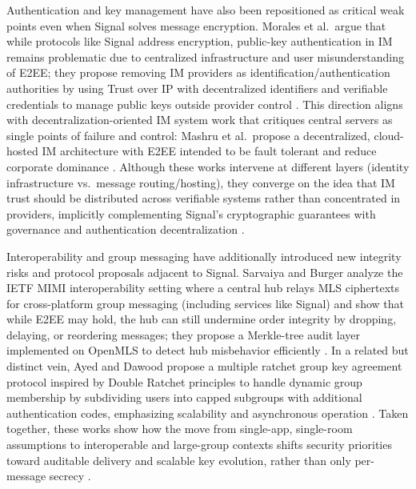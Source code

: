 Authentication and key management have also been repositioned as critical weak points even when Signal solves message encryption. Morales et al.\ argue that while protocols like Signal address encryption, public-key authentication in IM remains problematic due to centralized infrastructure and user misunderstanding of E2EE; they propose removing IM providers as identification/authentication authorities by using Trust over IP with decentralized identifiers and verifiable credentials to manage public keys outside provider control \cite{morales2024}. This direction aligns with decentralization-oriented IM system work that critiques central servers as single points of failure and control: Mashru et al.\ propose a decentralized, cloud-hosted IM architecture with E2EE intended to be fault tolerant and reduce corporate dominance \cite{mashru2023}. Although these works intervene at different layers (identity infrastructure vs.\ message routing/hosting), they converge on the idea that IM trust should be distributed across verifiable systems rather than concentrated in providers, implicitly complementing Signal’s cryptographic guarantees with governance and authentication decentralization \cite{morales2024,mashru2023}.

Interoperability and group messaging have additionally introduced new integrity risks and protocol proposals adjacent to Signal. Sarvaiya and Burger analyze the IETF MIMI interoperability setting where a central hub relays MLS ciphertexts for cross-platform group messaging (including services like Signal) and show that while E2EE may hold, the hub can still undermine order integrity by dropping, delaying, or reordering messages; they propose a Merkle-tree audit layer implemented on OpenMLS to detect hub misbehavior efficiently \cite{sarvaiya2025}. In a related but distinct vein, Ayed and Dawood propose a multiple ratchet group key agreement protocol inspired by Double Ratchet principles to handle dynamic group membership by subdividing users into capped subgroups with additional authentication codes, emphasizing scalability and asynchronous operation \cite{ayed2025}. Taken together, these works show how the move from single-app, single-room assumptions to interoperable and large-group contexts shifts security priorities toward auditable delivery and scalable key evolution, rather than only per-message secrecy \cite{sarvaiya2025,ayed2025}.

